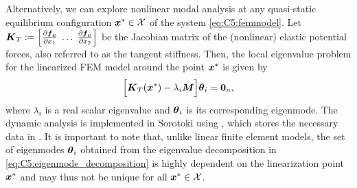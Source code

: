 Alternatively, we can explore nonlinear modal analysis at any quasi-static equilibrium configuration ${\boldsymbol{x}}^* \in \mathcal{X}$ of the system \eqref{eq:C5:femmodel}. Let ${\boldsymbol{K}}_T:= \left[\frac{\partial {\boldsymbol{f}}_{\scriptstyle\textrm{e}}}{\partial x_1} \;\hdots\; \frac{\partial {\boldsymbol{f}}_{\scriptstyle\textrm{e}}}{\partial x_2} \right]$ be the Jacobian matrix of the (nonlinear) elastic potential forces, also referred to as the tangent stiffness. Then, the local eigenvalue problem for the linearized FEM model around the point ${\boldsymbol{x}}^*$ is given by 
%
\begin{equation}
\Big[{\boldsymbol{K}}_T({\boldsymbol{x}}^*)- \lambda_i {\boldsymbol{M}} \Big] {\boldsymbol{\theta}}_i = \boldsymbol{0}_n,
\label{eq:C5:eigenmode_decomposition}
\end{equation}
%
where $\lambda_i$ is a real scalar eigenvalue and ${\boldsymbol{\theta}}_i$ is its corresponding eigenmode. The dynamic analysis is implemented in Sorotoki using , which stores the necessary data in . It is important to note that, unlike linear finite element models, the set of eigenmodes ${{\boldsymbol{\theta}}_i}$ obtained from the eigenvalue decomposition in \eqref{eq:C5:eigenmode_decomposition} is highly dependent on the linearization point ${\boldsymbol{x}}^*$ and may thus not be unique for all ${\boldsymbol{x}}^* \in \mathcal{X}$.

